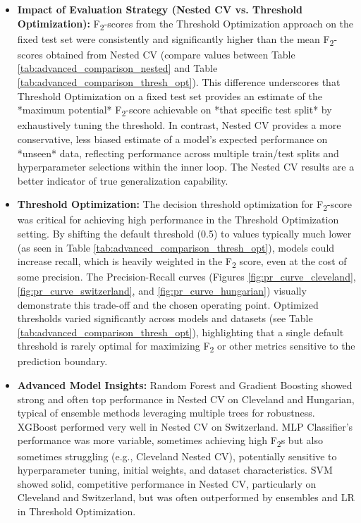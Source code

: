 \documentclass{article}
\begin{document}
\begin{itemize}
    \item \textbf{Impact of Evaluation Strategy (Nested CV vs. Threshold Optimization):} F\textsubscript{2}-scores from the Threshold Optimization approach on the fixed test set were consistently and significantly higher than the mean F\textsubscript{2}-scores obtained from Nested CV (compare values between Table \ref{tab:advanced_comparison_nested} and Table \ref{tab:advanced_comparison_thresh_opt}). This difference underscores that Threshold Optimization on a fixed test set provides an estimate of the *maximum potential* F\textsubscript{2}-score achievable on *that specific test split* by exhaustively tuning the threshold. In contrast, Nested CV provides a more conservative, less biased estimate of a model's expected performance on *unseen* data, reflecting performance across multiple train/test splits and hyperparameter selections within the inner loop. The Nested CV results are a better indicator of true generalization capability.
    \item \textbf{Threshold Optimization:} The decision threshold optimization for F\textsubscript{2}-score was critical for achieving high performance in the Threshold Optimization setting. By shifting the default threshold (0.5) to values typically much lower (as seen in Table \ref{tab:advanced_comparison_thresh_opt}), models could increase recall, which is heavily weighted in the F\textsubscript{2} score, even at the cost of some precision. The Precision-Recall curves (Figures \ref{fig:pr_curve_cleveland}, \ref{fig:pr_curve_switzerland}, and \ref{fig:pr_curve_hungarian}) visually demonstrate this trade-off and the chosen operating point. Optimized thresholds varied significantly across models and datasets (see Table \ref{tab:advanced_comparison_thresh_opt}), highlighting that a single default threshold is rarely optimal for maximizing F\textsubscript{2} or other metrics sensitive to the prediction boundary.
    \item \textbf{Advanced Model Insights:} Random Forest and Gradient Boosting showed strong and often top performance in Nested CV on Cleveland and Hungarian, typical of ensemble methods leveraging multiple trees for robustness. XGBoost performed very well in Nested CV on Switzerland. MLP Classifier's performance was more variable, sometimes achieving high F\textsubscript{2}s but also sometimes struggling (e.g., Cleveland Nested CV), potentially sensitive to hyperparameter tuning, initial weights, and dataset characteristics. SVM showed solid, competitive performance in Nested CV, particularly on Cleveland and Switzerland, but was often outperformed by ensembles and LR in Threshold Optimization.

\end{itemize}
\end{document}
